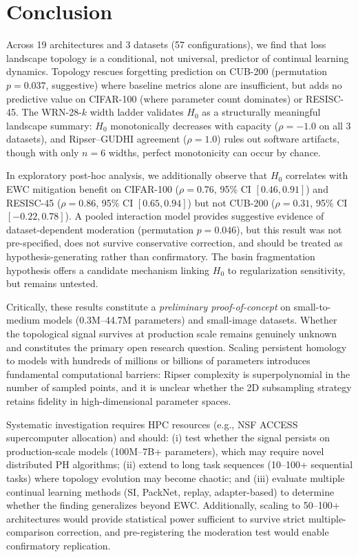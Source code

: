 \documentclass[10pt,twocolumn]{article}
\begin{document}
\section{Conclusion}
\label{sec:conclusion}

Across 19 architectures and 3 datasets (57 configurations), we find that loss landscape topology is a conditional, not universal, predictor of continual learning dynamics. Topology rescues forgetting prediction on CUB-200 (permutation $p = 0.037$, suggestive) where baseline metrics alone are insufficient, but adds no predictive value on CIFAR-100 (where parameter count dominates) or RESISC-45. The WRN-28-$k$ width ladder validates $H_0$ as a structurally meaningful landscape summary: $H_0$ monotonically decreases with capacity ($\rho = -1.0$ on all 3 datasets), and Ripser--GUDHI agreement ($\rho = 1.0$) rules out software artifacts, though with only $n = 6$ widths, perfect monotonicity can occur by chance.

In exploratory post-hoc analysis, we additionally observe that $H_0$ correlates with EWC mitigation benefit on CIFAR-100 ($\rho = 0.76$, 95\% CI $[0.46, 0.91]$) and RESISC-45 ($\rho = 0.86$, 95\% CI $[0.65, 0.94]$) but not CUB-200 ($\rho = 0.31$, 95\% CI $[-0.22, 0.78]$). A pooled interaction model provides suggestive evidence of dataset-dependent moderation (permutation $p = 0.046$), but this result was not pre-specified, does not survive conservative correction, and should be treated as hypothesis-generating rather than confirmatory. The basin fragmentation hypothesis offers a candidate mechanism linking $H_0$ to regularization sensitivity, but remains untested.

Critically, these results constitute a \emph{preliminary proof-of-concept} on small-to-medium models (0.3M--44.7M parameters) and small-image datasets. Whether the topological signal survives at production scale remains genuinely unknown and constitutes the primary open research question. Scaling persistent homology to models with hundreds of millions or billions of parameters introduces fundamental computational barriers: Ripser complexity is superpolynomial in the number of sampled points, and it is unclear whether the 2D subsampling strategy retains fidelity in high-dimensional parameter spaces.

Systematic investigation requires HPC resources (e.g., NSF ACCESS supercomputer allocation) and should: (i) test whether the signal persists on production-scale models (100M--7B+ parameters), which may require novel distributed PH algorithms; (ii) extend to long task sequences (10--100+ sequential tasks) where topology evolution may become chaotic; and (iii) evaluate multiple continual learning methods (SI, PackNet, replay, adapter-based) to determine whether the finding generalizes beyond EWC. Additionally, scaling to 50--100+ architectures would provide statistical power sufficient to survive strict multiple-comparison correction, and pre-registering the moderation test would enable confirmatory replication.


\end{document}
